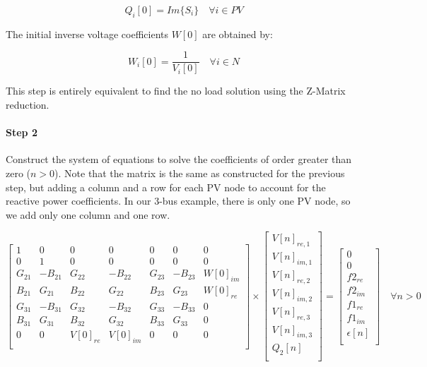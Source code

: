 \documentclass[nols,a4paper,twoside,notoc,fleqn]{tufte-book}
\begin{document}
\begin{equation}
{Q}_i[0] = Im \{ {S}_{i} \}  \quad \forall i \in PV
\end{equation}

The initial inverse voltage coefficients ${W}[0]$ are obtained by:

\begin{equation}
W_i[0] = \frac{1}{V_i[0]}  \quad \forall i \in N
\end{equation}

This step is entirely equivalent to find the no load solution using the Z-Matrix reduction.

\paragraph{Step 2}

Construct the system of equations to solve the coefficients of order greater than zero ($n>0$). Note that the matrix is the same as constructed for the previous step, but adding a column and a row for each PV node to account for the reactive power coefficients. In our 3-bus example, there is only one PV node, so we add only one column and one row.

\begin{equation}
\begin{bmatrix}
1 & 0 & 0 & 0 & 0 & 0 & 0\\
0 & 1 & 0 & 0 & 0 & 0 & 0\\
G_{21} & -B_{21} & G_{22} & -B_{22} & G_{23} & -B_{23} & W[0]_{im}\\
B_{21} & G_{21}  & B_{22} & G_{22}  & B_{23} & G_{23} & W[0]_{re}\\
G_{31} & -B_{31} & G_{32} & -B_{32} & G_{33} & -B_{33} & 0\\
B_{31} & G_{31}  & B_{32} & G_{32}  & B_{33} & G_{33} & 0\\
0 & 0 & V[0]_{re} & V[0]_{im} & 0 & 0 & 0\\
\end{bmatrix}
\times
\begin{bmatrix}
V[n]_{re, 1}\\
V[n]_{im, 1}\\
V[n]_{re, 2}\\
V[n]_{im, 2}\\
V[n]_{re, 3}\\
V[n]_{im, 3}\\
Q_2[n]\\
\end{bmatrix}
=
\begin{bmatrix}
0\\
0\\
f2_{re}\\
f2_{im}\\
f1_{re}\\
f1_{im}\\
\epsilon[n]\\
\end{bmatrix}
\quad \forall n > 0
\label{lin_sys_2}
\end{equation}
\end{document}
